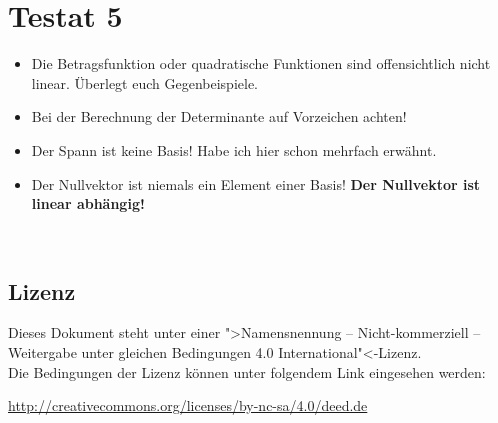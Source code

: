 \documentclass[11pt, a4paper]{article}
\begin{document}
\section*{Testat 5}
\begin{itemize}
\item Die Betragsfunktion oder quadratische Funktionen sind offensichtlich nicht linear. Überlegt euch Gegenbeispiele.

\item Bei der Berechnung der Determinante auf Vorzeichen achten!

\item Der Spann ist keine Basis! Habe ich hier schon mehrfach erwähnt.

\item Der Nullvektor ist niemals ein Element einer Basis! \textbf{Der Nullvektor ist linear abhängig!}
\end{itemize}









\newpage
~
\vfill
{\footnotesize
\subsection*{Lizenz}
Dieses Dokument steht unter einer ">Namensnennung -- Nicht-kommerziell -- Weitergabe unter gleichen Bedingungen 4.0 International"<-Lizenz.\\

\noindent
Die Bedingungen der Lizenz können unter folgendem Link eingesehen werden: 

\noindent
\url{http://creativecommons.org/licenses/by-nc-sa/4.0/deed.de}}
\end{document}
